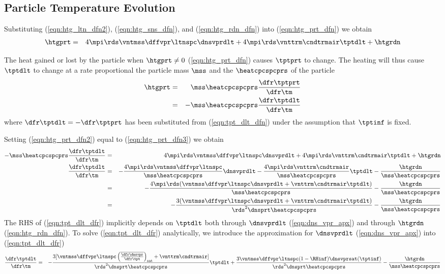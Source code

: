 \documentclass[12pt,twoside]{book}
\begin{document}
\subsection{Particle Temperature Evolution}\label{sxn:tpt_prt}
Substituting (\ref{eqn:htg_ltn_dfn2}), (\ref{eqn:htg_sns_dfn}), and
(\ref{eqn:htg_rdn_dfn}) into (\ref{eqn:htg_prt_dfn}) we obtain
\begin{eqnarray}
\htgprt & = & 
4 \mpi \rds \vntmss \dffvpr \ltnspc \dnsvprdlt +
4 \mpi \rds \vnttrm \cndtrmair \tptdlt + 
\htgrdn
\label{eqn:htg_prt_dfn2}
\end{eqnarray}

The heat gained or lost by the particle when $\htgprt \ne 0$
(\ref{eqn:htg_prt_dfn}) causes $\tptprt$ to change.
The heating will thus cause $\tptdlt$ to change at a rate
proportional the particle mass $\mss$ and the 
 $\heatcpcspcprs$ 
of the particle
\begin{eqnarray}
\htgprt & = & \mss \heatcpcspcprs \frac{\dfr\tptprt}{\dfr\tm} \nonumber \\ 
& = & - \mss \heatcpcspcprs \frac{\dfr\tptdlt}{\dfr\tm}
\label{eqn:htg_prt_dfn3}
\end{eqnarray}
where $\dfr\tptdlt = - \dfr\tptprt$ has been substituted from
(\ref{eqn:tpt_dlt_dfn}) under the assumption that $\tptinf$ is fixed. 

Setting (\ref{eqn:htg_prt_dfn2}) equal to (\ref{eqn:htg_prt_dfn3}) 
we obtain
\begin{eqnarray}
- \mss \heatcpcspcprs \frac{\dfr\tptdlt}{\dfr\tm} & = & 
4 \mpi \rds \vntmss \dffvpr \ltnspc \dnsvprdlt +
4 \mpi \rds \vnttrm \cndtrmair \tptdlt + \htgrdn \nonumber \\
\frac{\dfr\tptdlt}{\dfr\tm} 
& = & 
- \frac{4 \mpi \rds \vntmss \dffvpr \ltnspc}{\mss \heatcpcspcprs} \dnsvprdlt
- \frac{4 \mpi \rds \vnttrm \cndtrmair}{\mss \heatcpcspcprs} \tptdlt
- \frac{\htgrdn}{\mss \heatcpcspcprs} \nonumber \\
& = & 
- \frac{4 \mpi \rds (\vntmss \dffvpr \ltnspc \dnsvprdlt + 
\vnttrm \cndtrmair \tptdlt)}{\mss \heatcpcspcprs} 
- \frac{\htgrdn}{\mss \heatcpcspcprs} \nonumber \\
& = & 
- \frac{3 (\vntmss \dffvpr \ltnspc \dnsvprdlt + 
\vnttrm \cndtrmair \tptdlt)}{\rds^{2} \dnsprt \heatcpcspcprs} 
- \frac{\htgrdn}{\mss \heatcpcspcprs}
\label{eqn:tpt_dlt_dfr}
\end{eqnarray}
The RHS of (\ref{eqn:tpt_dlt_dfr}) implicitly depends on
$\tptdlt$ both through $\dnsvprdlt$ (\ref{eqn:dns_vpr_apx})
and through $\htgrdn$ (\ref{eqn:htg_rdn_dfn}).
To solve (\ref{eqn:tpt_dlt_dfr}) analytically, we introduce the
approximation for $\dnsvprdlt$ (\ref{eqn:dns_vpr_apx}) into
(\ref{eqn:tpt_dlt_dfr}) 
\begin{eqnarray}
\frac{\dfr\tptdlt}{\dfr\tm} 
& = & 
- \frac{3 [\vntmss \dffvpr \ltnspc 
\left( \overline{\frac{\dfr\dnsvpr}{\dfr\tpt}} \right)_{\mathrm{sat}} +
\vnttrm \cndtrmair ]}{\rds^{2} \dnsprt \heatcpcspcprs} \tptdlt
+ \frac{3 \vntmss \dffvpr \ltnspc ( 1 - \RHinf ) \dnsvprsat ( \tptinf )}
{\rds^{2} \dnsprt \heatcpcspcprs} 
- \frac{\htgrdn}{\mss \heatcpcspcprs}
\label{eqn:tpt_dlt_dfr_apx}
\end{eqnarray}
\end{document}
